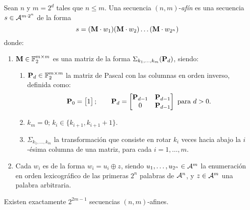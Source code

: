 \begin{defi}
  Sean $n$ y $m = 2^d$ tales que $n \leq m$.
  Una secuencia $(n,m)$-\emph{afín} es una secuencia $s \in
    \mathcal{A}^{m \cdot 2^n}$ de la forma
  \[ s = (\mathbf{M} \cdot w_1)(\mathbf{M} \cdot w_2)\dots(\mathbf{M} \cdot w_{2^n}) \]
  donde:
  \begin{enumerate}
    \item $\mathbf{M} \in \mathbb{F}_2^{m \times m}$ es una matriz de la forma
          $\Sigma_{k_1,\dots,k_{m}}(\mathbf{P}_d)$, siendo:
          \begin{enumerate}
            \item $\mathbf{P}_d \in \mathbb{F}_2^{m \times m}$ la matriz de Pascal
                  con las columnas en orden inverso, definida como:
                  \[
                    \mathbf{P}_0 = \begin{bmatrix} 1 \end{bmatrix}; \qquad
                    \mathbf{P}_d = \begin{bmatrix}
                      \mathbf{P}_{d-1} & \mathbf{P}_{d-1} \\
                      0             & \mathbf{P}_{d-1} \\
                    \end{bmatrix} \text{ para } d > 0.
                  \]
            \item $k_m = 0$; \qquad $k_i \in \lbrace k_{i+1}, k_{i+1} + 1
                    \rbrace$.
            \item $\Sigma_{k_1,\dots,k_m}$ la transformación que consiste
                  en rotar $k_i$ veces hacia abajo la $i$-ésima columna de una
                  matriz, para cada $i = 1,\dots,m$.
          \end{enumerate}
    \item Cada $w_i$ es de la forma $w_i = u_i \oplus z$, siendo
          $u_1,\dots,u_{2^n} \in \mathcal{A}^m$ la enumeración en orden
          lexicográfico de las primeras $2^n$ palabras de $\mathcal{A}^n$, y $z
            \in \mathcal{A}^m$ una palabra arbitraria.
  \end{enumerate}
\end{defi}

\begin{prop}
  Existen exactamente $2^{2m - 1}$ secuencias $(n,m)$-afines.
\end{prop}

